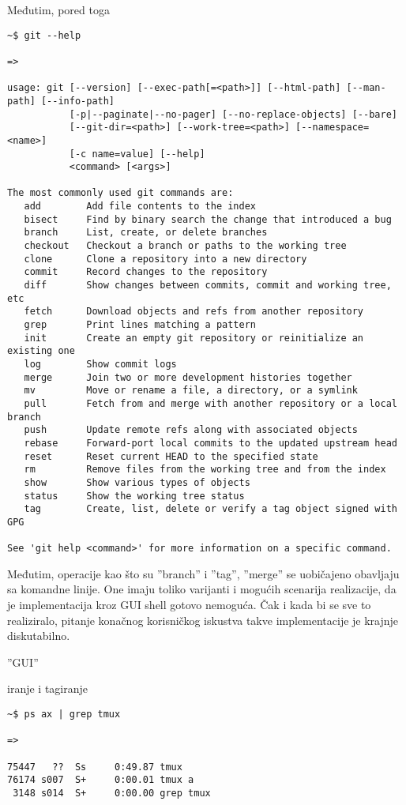\documentclass[times, utf8, seminar]{fit}
\begin{document}
Međutim, pored toga


\begin{lstlisting}
~$ git --help

=>

usage: git [--version] [--exec-path[=<path>]] [--html-path] [--man-path] [--info-path]
           [-p|--paginate|--no-pager] [--no-replace-objects] [--bare]
           [--git-dir=<path>] [--work-tree=<path>] [--namespace=<name>]
           [-c name=value] [--help]
           <command> [<args>]

The most commonly used git commands are:
   add        Add file contents to the index
   bisect     Find by binary search the change that introduced a bug
   branch     List, create, or delete branches
   checkout   Checkout a branch or paths to the working tree
   clone      Clone a repository into a new directory
   commit     Record changes to the repository
   diff       Show changes between commits, commit and working tree, etc
   fetch      Download objects and refs from another repository
   grep       Print lines matching a pattern
   init       Create an empty git repository or reinitialize an existing one
   log        Show commit logs
   merge      Join two or more development histories together
   mv         Move or rename a file, a directory, or a symlink
   pull       Fetch from and merge with another repository or a local branch
   push       Update remote refs along with associated objects
   rebase     Forward-port local commits to the updated upstream head
   reset      Reset current HEAD to the specified state
   rm         Remove files from the working tree and from the index
   show       Show various types of objects
   status     Show the working tree status
   tag        Create, list, delete or verify a tag object signed with GPG

See 'git help <command>' for more information on a specific command.
\end{lstlisting}

Međutim, operacije kao što su ''branch'' i ''tag'', ''merge'' se uobičajeno obavljaju sa komandne linije.
One imaju toliko varijanti i mogućih scenarija realizacije, da je implementacija kroz GUI shell gotovo nemoguća. Čak i kada bi se sve to realiziralo, pitanje konačnog korisničkog iskustva takve implementacije je krajnje diskutabilno.

''GUI''


iranje i tagiranje


\begin{lstlisting}
~$ ps ax | grep tmux

=>

75447   ??  Ss     0:49.87 tmux
76174 s007  S+     0:00.01 tmux a
 3148 s014  S+     0:00.00 grep tmux
\end{lstlisting}
\end{document}
